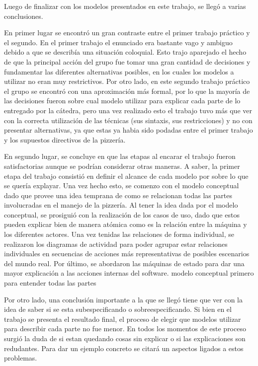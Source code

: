 \documentclass[a4paper,10pt]{article}
\begin{document}
Luego de finalizar con los modelos presentados en este trabajo, se lleg\'o a varias conclusiones.

En primer lugar se encontr\'o un gran contraste entre el primer trabajo pr\'actico y el segundo.
En el primer trabajo el enunciado era bastante vago y ambiguo debido a que se describ\'ia una situaci\'on coloquial. Esto
trajo aparejado el hecho de que la principal acci\'on del grupo fue tomar una gran cantidad de decisiones y fundamentar las diferentes
alternativas posibles, en los cuales los modelos a utilizar no eran muy restrictivos. Por otro lado, en este segundo trabajo pr\'actico el grupo se encontr\'o
con una aproximaci\'on m\'as formal, por lo que la mayor\'ia de las decisiones fueron sobre cual modelo utilizar para explicar cada parte de lo
entregado por la c\'atedra, pero una vez realizado esto el trabajo tuvo m\'as que ver con la correcta utilizaci\'on de las t\'ecnicas (sus sintaxis, sus restricciones)
y no con presentar alternativas, ya que estas ya habia sido podadas entre el primer trabajo y los supuestos directivos de la pizzer\'ia.

En segundo lugar, se concluye en que las etapas al encarar el trabajo fueron satisfactorias aunque se podr\'ian considerar otras maneras.
A saber, la primer etapa del trabajo consisti\'o en definir el alcance de cada modelo por sobre lo que se quer\'ia explayar. Una vez hecho esto, 
se comenzo con el modelo conceptual dado que provee una idea temprana de como se relacionan todas las partes involucradas en el manejo de la pizzer\'ia.
Al tener la idea dada por el modelo conceptual, se prosigui\'o con la realizaci\'on de los casos de uso, dado que estos pueden explicar bien de manera
at\'omica como es la relaci\'on entre la m\'aquina y los diferentes actores. Una vez tenidas las relaciones de forma individual, se realizaron los 
diagramas de actividad para poder agrupar estar relaciones individuales en secuencias de acciones m\'as representativas de posibles escenarios del mundo real.
Por \'ultimo, se abordaron las m\'aquinas de estado para dar una mayor explicaci\'on a las acciones internas del software.
modelo conceptual primero para entender todas las partes

\medskip

Por otro lado, una conclusi\'on importante a la que se lleg\'o tiene que ver con la idea de saber si se esta subespecificando o sobreespecificando.
Si bien en el trabajo se presenta el resultado final, el proceso de elegir que modelos utilizar para describir cada parte no fue menor. En todos
los momentos de este proceso surgi\'o la duda de si estan quedando cosas sin explicar o si las explicaciones son redudantes. Para dar un ejemplo 
concreto se citar\'a un aspectos ligados a estos problemas. 
\end{document}
